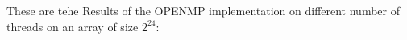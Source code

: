 These are tehe Results of the OPENMP implementation on different number of
threads on an array of size  $2^{24}$:



